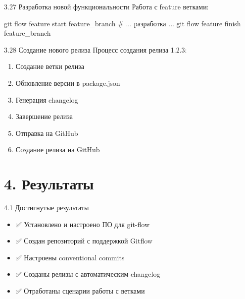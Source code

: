 \documentclass[
  ignorenonframetext,
  aspectratio=169,
  russian,
]{beamer}
\newenvironment{Shaded}{\begin{snugshade}}{\end{snugshade}}
\newcommand{\CommentTok}[1]{\textcolor[rgb]{0.37,0.37,0.37}{#1}}
\newcommand{\FunctionTok}[1]{\textcolor[rgb]{0.28,0.35,0.67}{#1}}
\newcommand{\NormalTok}[1]{\textcolor[rgb]{0.00,0.23,0.31}{#1}}
\providecommand{\tightlist}{%
  \setlength{\itemsep}{0pt}\setlength{\parskip}{0pt}}
\begin{document}
\begin{frame}[fragile]{3.27 Разработка новой функциональности}
\label{ux440ux430ux437ux440ux430ux431ux43eux442ux43aux430-ux43dux43eux432ux43eux439-ux444ux443ux43dux43aux446ux438ux43eux43dux430ux43bux44cux43dux43eux441ux442ux438}
Работа с feature ветками:

\begin{Shaded}
\begin{Highlighting}[]
\FunctionTok{git}\NormalTok{ flow feature start feature\_branch}
\CommentTok{\# ... разработка ...}
\FunctionTok{git}\NormalTok{ flow feature finish feature\_branch}
\end{Highlighting}
\end{Shaded}
\end{frame}

\begin{frame}{3.28 Создание нового релиза}
\label{ux441ux43eux437ux434ux430ux43dux438ux435-ux43dux43eux432ux43eux433ux43e-ux440ux435ux43bux438ux437ux430}
Процесс создания релиза 1.2.3:

\begin{enumerate}[<+->]
\tightlist
\item
  Создание ветки релиза
\item
  Обновление версии в package.json
\item
  Генерация changelog
\item
  Завершение релиза
\item
  Отправка на GitHub
\item
  Создание релиза на GitHub
\end{enumerate}
\end{frame}

\section{4. Результаты}\label{ux440ux435ux437ux443ux43bux44cux442ux430ux442ux44b}

\begin{frame}{4.1 Достигнутые результаты}
\label{ux434ux43eux441ux442ux438ux433ux43dux443ux442ux44bux435-ux440ux435ux437ux443ux43bux44cux442ux430ux442ux44b}
\begin{itemize}[<+->]
\tightlist
\item
  ✅ Установлено и настроено ПО для git-flow
\item
  ✅ Создан репозиторий с поддержкой Gitflow
\item
  ✅ Настроены conventional commits
\item
  ✅ Созданы релизы с автоматическим changelog
\item
  ✅ Отработаны сценарии работы с ветками
\end{itemize}
\end{frame}
\end{document}

